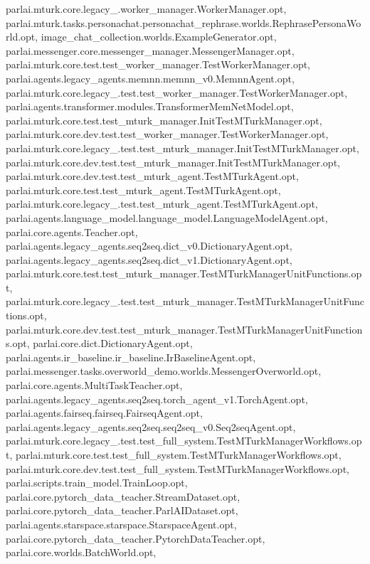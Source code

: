 parlai.\+mturk.\+core.\+legacy\+\_.\+worker\+\_\+manager.\+Worker\+Manager.\+opt, parlai.\+mturk.\+tasks.\+personachat.\+personachat\+\_\+rephrase.\+worlds.\+Rephrase\+Persona\+World.\+opt, image\+\_\+chat\+\_\+collection.\+worlds.\+Example\+Generator.\+opt, parlai.\+messenger.\+core.\+messenger\+\_\+manager.\+Messenger\+Manager.\+opt, parlai.\+mturk.\+core.\+test.\+test\+\_\+worker\+\_\+manager.\+Test\+Worker\+Manager.\+opt, parlai.\+agents.\+legacy\+\_\+agents.\+memnn.\+memnn\+\_\+v0.\+Memnn\+Agent.\+opt, parlai.\+mturk.\+core.\+legacy\+\_.\+test.\+test\+\_\+worker\+\_\+manager.\+Test\+Worker\+Manager.\+opt, parlai.\+agents.\+transformer.\+modules.\+Transformer\+Mem\+Net\+Model.\+opt, parlai.\+mturk.\+core.\+test.\+test\+\_\+mturk\+\_\+manager.\+Init\+Test\+M\+Turk\+Manager.\+opt, parlai.\+mturk.\+core.\+dev.\+test.\+test\+\_\+worker\+\_\+manager.\+Test\+Worker\+Manager.\+opt, parlai.\+mturk.\+core.\+legacy\+\_.\+test.\+test\+\_\+mturk\+\_\+manager.\+Init\+Test\+M\+Turk\+Manager.\+opt, parlai.\+mturk.\+core.\+dev.\+test.\+test\+\_\+mturk\+\_\+manager.\+Init\+Test\+M\+Turk\+Manager.\+opt, parlai.\+mturk.\+core.\+dev.\+test.\+test\+\_\+mturk\+\_\+agent.\+Test\+M\+Turk\+Agent.\+opt, parlai.\+mturk.\+core.\+test.\+test\+\_\+mturk\+\_\+agent.\+Test\+M\+Turk\+Agent.\+opt, parlai.\+mturk.\+core.\+legacy\+\_.\+test.\+test\+\_\+mturk\+\_\+agent.\+Test\+M\+Turk\+Agent.\+opt, parlai.\+agents.\+language\+\_\+model.\+language\+\_\+model.\+Language\+Model\+Agent.\+opt, parlai.\+core.\+agents.\+Teacher.\+opt, parlai.\+agents.\+legacy\+\_\+agents.\+seq2seq.\+dict\+\_\+v0.\+Dictionary\+Agent.\+opt, parlai.\+agents.\+legacy\+\_\+agents.\+seq2seq.\+dict\+\_\+v1.\+Dictionary\+Agent.\+opt, parlai.\+mturk.\+core.\+test.\+test\+\_\+mturk\+\_\+manager.\+Test\+M\+Turk\+Manager\+Unit\+Functions.\+opt, parlai.\+mturk.\+core.\+legacy\+\_.\+test.\+test\+\_\+mturk\+\_\+manager.\+Test\+M\+Turk\+Manager\+Unit\+Functions.\+opt, parlai.\+mturk.\+core.\+dev.\+test.\+test\+\_\+mturk\+\_\+manager.\+Test\+M\+Turk\+Manager\+Unit\+Functions.\+opt, parlai.\+core.\+dict.\+Dictionary\+Agent.\+opt, parlai.\+agents.\+ir\+\_\+baseline.\+ir\+\_\+baseline.\+Ir\+Baseline\+Agent.\+opt, parlai.\+messenger.\+tasks.\+overworld\+\_\+demo.\+worlds.\+Messenger\+Overworld.\+opt, parlai.\+core.\+agents.\+Multi\+Task\+Teacher.\+opt, parlai.\+agents.\+legacy\+\_\+agents.\+seq2seq.\+torch\+\_\+agent\+\_\+v1.\+Torch\+Agent.\+opt, parlai.\+agents.\+fairseq.\+fairseq.\+Fairseq\+Agent.\+opt, parlai.\+agents.\+legacy\+\_\+agents.\+seq2seq.\+seq2seq\+\_\+v0.\+Seq2seq\+Agent.\+opt, parlai.\+mturk.\+core.\+legacy\+\_.\+test.\+test\+\_\+full\+\_\+system.\+Test\+M\+Turk\+Manager\+Workflows.\+opt, parlai.\+mturk.\+core.\+test.\+test\+\_\+full\+\_\+system.\+Test\+M\+Turk\+Manager\+Workflows.\+opt, parlai.\+mturk.\+core.\+dev.\+test.\+test\+\_\+full\+\_\+system.\+Test\+M\+Turk\+Manager\+Workflows.\+opt, parlai.\+scripts.\+train\+\_\+model.\+Train\+Loop.\+opt, parlai.\+core.\+pytorch\+\_\+data\+\_\+teacher.\+Stream\+Dataset.\+opt, parlai.\+core.\+pytorch\+\_\+data\+\_\+teacher.\+Parl\+A\+I\+Dataset.\+opt, parlai.\+agents.\+starspace.\+starspace.\+Starspace\+Agent.\+opt, parlai.\+core.\+pytorch\+\_\+data\+\_\+teacher.\+Pytorch\+Data\+Teacher.\+opt, parlai.\+core.\+worlds.\+Batch\+World.\+opt, 